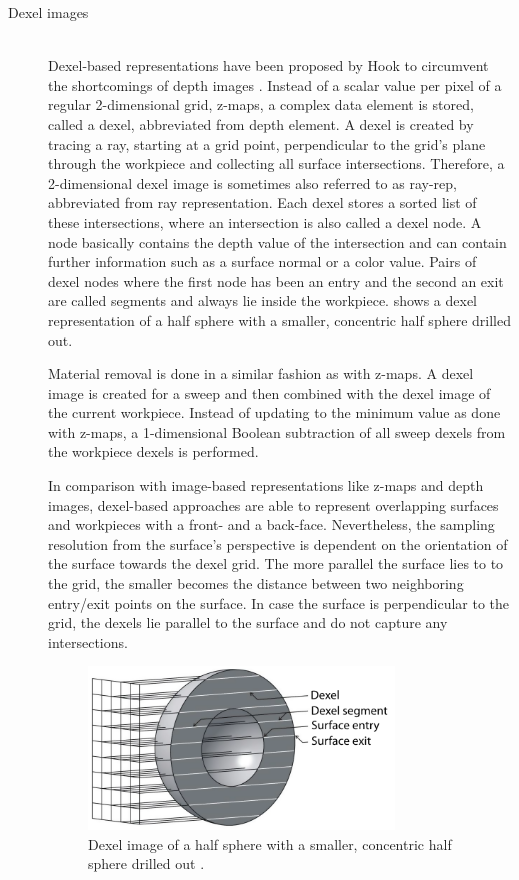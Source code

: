 \begin{description}
	\item[Dexel images] \hfill \\
	Dexel-based representations have been proposed by Hook to circumvent the shortcomings of depth images \cite{dexel}.
	Instead of a scalar value per pixel of a regular 2-dimensional grid, z-maps, a complex data element is stored, called a dexel, abbreviated from depth element.
	A dexel is created by tracing a ray, starting at a grid point, perpendicular to the grid's plane through the workpiece and collecting all surface intersections.
	Therefore, a 2-dimensional dexel image is sometimes also referred to as ray-rep, abbreviated from ray representation.
	Each dexel stores a sorted list of these intersections, where an intersection is also called a dexel node.
	A node basically contains the depth value of the intersection and can contain further information such as a surface normal or a color value.
	Pairs of dexel nodes where the first node has been an entry and the second an exit are called segments and always lie inside the workpiece.
	 shows a dexel representation of a half sphere with a smaller, concentric half sphere drilled out.

	Material removal is done in a similar fashion as with z-maps.
	A dexel image is created for a sweep and then combined with the dexel image of the current workpiece.
	Instead of updating to the minimum value as done with z-maps, a 1-dimensional Boolean subtraction of all sweep dexels from the workpiece dexels is performed.

	In comparison with image-based representations like z-maps and depth images, dexel-based approaches are able to represent overlapping surfaces and workpieces with a front- and a back-face.
	Nevertheless, the sampling resolution from the surface's perspective is dependent on the orientation of the surface towards the dexel grid.
	The more parallel the surface lies to to the grid, the smaller becomes the distance between two neighboring entry/exit points on the surface.
	In case the surface is perpendicular to the grid, the dexels lie parallel to the surface and do not capture any intersections.

	\begin{figure}[H]
		\centering
		\includegraphics[width=0.8\textwidth]{images/dexels}
		\caption{
			Dexel image of a half sphere with a smaller, concentric half sphere drilled out \cite{virtual_machining_review}.
		}
		\label{fig:dexel_image}
	\end{figure}



\end{description}
